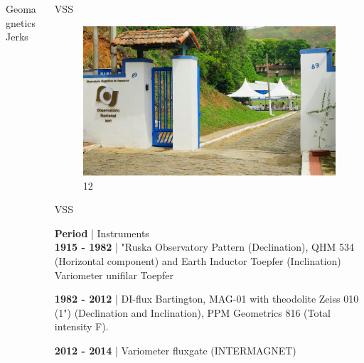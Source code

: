 \documentclass[final,t]{beamer}
\begin{document}
\begin{columns}[t]
\begin{column}{.25\linewidth}
\begin{block}{Geomagnetics Jerks}
		
	\end{block}
\end{column}



\begin{column}{.25\linewidth}



\begin{block}{VSS}
	\justifying
\begin{figure}
\centering
\includegraphics[width=0.9\linewidth]{OMV_JOELSONMOREIRA}
\caption{12}
\label{fig:OMV_JOELSONMOREIRA}
\end{figure}





\end{block}


\begin{block}{VSS}
\justifying

	 \textbf{Period} |\hspace{2.0cm}  Instruments   \\ 
	 
	 \textbf{1915 - 1982} | "Ruska Observatory Pattern (Declination), QHM 534 (Horizontal component) and Earth Inductor Toepfer (Inclination) Variometer unifilar Toepfer 
	 
	 \textbf{1982 - 2012} | DI-flux Bartington, MAG-01 with theodolite Zeiss 010 (1") (Declination and Inclination), PPM Geometrics 816 (Total intensity F).
	 
	 \textbf{2012 - 2014} | Variometer fluxgate (INTERMAGNET)


\\

	
\end{block}




\end{column}
\end{columns}
\end{document}
